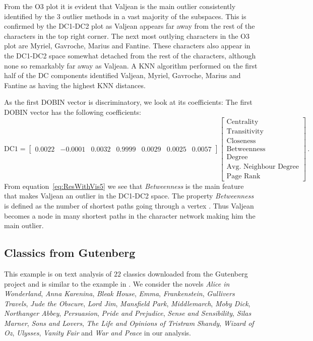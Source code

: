 \documentclass[11pt]{article}
\begin{document}
From the O3 plot it is evident that Valjean is the main outlier consistently identified by the $3$ outlier methods in a vast majority of the subspaces.  This is confirmed by the DC1-DC2 plot as Valjean appears far away from the rest of the characters in the top right corner.  The next most outlying characters in the O3 plot are Myriel, Gavroche, Marius and Fantine. These characters also appear in the DC1-DC2 space somewhat detached from the rest of the characters, although none so remarkably far away as Valjean. A KNN algorithm performed on the first half of the DC components identified Valjean, Myriel, Gavroche, Marius and Fantine as having the highest KNN distances. 

As the first DOBIN vector is discriminatory, we look at its coefficients:
The first DOBIN vector has the following coefficients:
\begin{equation}\label{eq:ResWithVis5}
    \text{DC1} = \begin{bmatrix}
    0.0022 & -0.0001 &  0.0032 & 0.9999 & 0.0029 & 0.0025 & 0.0057  
    \end{bmatrix}
    \begin{bmatrix}
    \text{Centrality} \\
    \text{Transitivity} \\
    \text{Closeness} \\
    \text{Betweenness} \\
    \text{Degree} \\
    \text{Avg. Neighbour Degree}\\
    \text{Page Rank}
    \end{bmatrix} \, .
\end{equation}
From equation~\eqref{eq:ResWithVis5} we see that \textit{Betweenness} is the main feature that makes Valjean an outlier in the DC1-DC2 space. The property \textit{Betweenness} is defined as the number of shortest paths going through a vertex \citep{igraph}. Thus Valjean becomes a node in many shortest paths in the character network making him the main outlier.  

\subsection{Classics from Gutenberg}\label{sec:ResWithVis6}
This example is on text analysis of $22$ classics downloaded from the Gutenberg project \citep{gutenberg} and  is similar to the example in \cite{wilkinson2017visualizing}. We consider the novels \textit{Alice in Wonderland}, \textit{Anna Karenina}, \textit{Bleak House}, \textit{Emma}, \textit{Frankenstein}, \textit{Gullivers Travels}, \textit{Jude the Obscure}, \textit{Lord Jim}, \textit{Mansfield Park}, \textit{Middlemarch}, \textit{Moby Dick}, \textit{Northanger Abbey}, \textit{Persuasion}, \textit{Pride and Prejudice}, \textit{Sense and Sensibility}, \textit{Silas Marner}, \textit{Sons and Lovers}, \textit{The Life and Opinions of Tristram Shandy}, \textit{Wizard of Oz}, \textit{Ulysses}, \textit{Vanity Fair} and  \textit{War and Peace} in our analysis. \\
\end{document}
